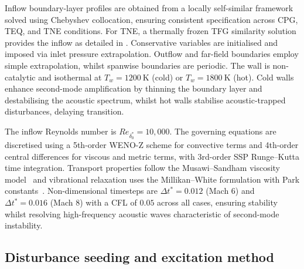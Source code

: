 Inflow boundary-layer profiles are obtained from a locally self-similar framework solved using Chebyshev collocation, ensuring consistent specification across \gls{CPG}, \gls{TEQ}, and \gls{TNE} conditions. For \gls{TNE}, a thermally frozen \gls{TFG} similarity solution provides the inflow as detailed in . Conservative variables are initialised and imposed via inlet pressure extrapolation. Outflow and far-field boundaries employ simple extrapolation, whilst spanwise boundaries are periodic. The wall is non-catalytic and isothermal at $T_w = 1200~\text{K}$ (cold) or $T_w = 1800~\text{K}$ (hot). Cold walls enhance second-mode amplification by thinning the boundary layer and destabilising the acoustic spectrum, whilst hot walls stabilise acoustic-trapped disturbances, delaying transition.

The inflow Reynolds number is $Re_{\delta^*_0} = 10{,}000$. The governing equations are discretised using a 5th-order WENO-Z scheme for convective terms and 4th-order central differences for viscous and metric terms, with 3rd-order SSP Runge--Kutta time integration. Transport properties follow the Musawi--Sandham viscosity model~\citep{Musawi2025} and vibrational relaxation uses the Millikan--White formulation with Park constants~\citep{Park1993}. Non-dimensional timesteps are $\Delta t^{*} = 0.012$ (Mach 6) and $\Delta t^{*} = 0.016$ (Mach 8) with a \gls{CFL} of $0.05$ across all cases, ensuring stability whilst resolving high-frequency acoustic waves characteristic of second-mode instability.

\subsection{Disturbance seeding and excitation method}

